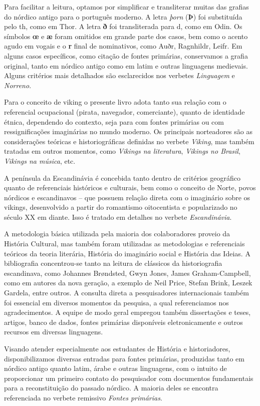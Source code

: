 Para facilitar a leitura, optamos por simplificar e transliterar muitas
das grafias do nórdico antigo para o português moderno. A letra
\emph{þorn} (\textbf{Þ}) foi substituída pelo th, como em Thor. A letra
\textbf{ð} foi transliterada para d, como em Odin. Os símbolos
\textbf{œ} e \textbf{æ} foram omitidos em grande parte dos casos, bem
como o acento agudo em vogais e o \textbf{r} final de nominativos, como
Auðr, Ragnhildr, Leifr. Em alguns casos específicos, como citação de
fontes primárias, conservamos a grafia original, tanto em nórdico antigo
como em latim e outras linguagens medievais. Alguns critérios mais
detalhados são esclarecidos nos verbetes \emph{Linguagem} e
\emph{Norreno}.

Para o conceito de viking o presente livro adota tanto sua relação com o
referencial ocupacional (pirata, navegador, comerciante), quanto de
identidade étnica, dependendo do contexto, seja para com fontes
primárias ou com ressignificações imaginárias no mundo moderno. Os
principais norteadores são as considerações teóricas e historiográficas
definidas no verbete \emph{Viking}, mas também tratadas em outros
momentos, como \emph{Vikings na literatura}, \emph{Vikings no Brasil},
\emph{Vikings na música}, etc.

A península da Escandinávia é concebida tanto dentro de critérios
geográfico quanto de referenciais históricos e culturais, bem como o
conceito de Norte, povos nórdicos e escandinavos -- que possuem relação
direta com o imaginário sobre os vikings, desenvolvido a partir do
romantismo oitocentista e popularizado no século XX em diante. Isso é
tratado em detalhes no verbete \emph{Escandinávia}.

A metodologia básica utilizada pela maioria dos colaboradores proveio da
História Cultural, mas também foram utilizadas as metodologias e
referenciais teóricos da teoria literária, História do imaginário social
e História das Ideias. A bibliografia concentrou-se tanto na leitura de
clássicos da historiografia escandinava, como Johannes Brøndsted, Gwyn
Jones, James Graham-Campbell, como em autores da nova geração, a exemplo
de Neil Price, Stefan Brink, Leszek Gardela, entre outros. A consulta
direta a pesquisadores internacionais também foi essencial em diversos
momentos da pesquisa, a qual referenciamos nos agradecimentos. A equipe
de modo geral empregou também dissertações e teses, artigos, banco de
dados, fontes primárias disponíveis eletronicamente e outros recursos em
diversas linguagens.

Visando atender especialmente aos estudantes de História e
historiadores, disponibilizamos diversas entradas para fontes primárias,
produzidas tanto em nórdico antigo quanto latim, árabe e outras
linguagens, com o intuito de proporcionar um primeiro contato do
pesquisador com documentos fundamentais para a reconstituição do passado
nórdico. A maioria deles se encontra referenciada no verbete remissivo
\emph{Fontes primárias}.

